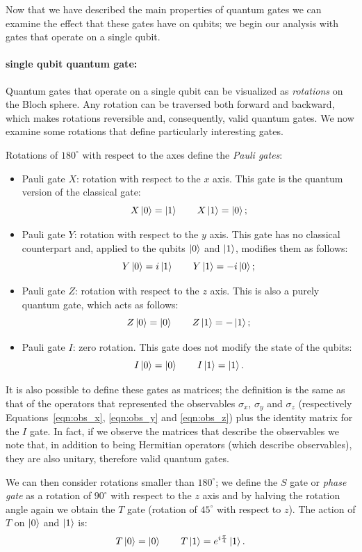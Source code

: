 Now that we have described the main properties of quantum gates we can examine the effect that these gates have on qubits; we begin our analysis with gates that operate on a single qubit.
\paragraph{single qubit quantum gate:}\label{par:single_gate} Quantum gates that operate on a single qubit can be visualized as \emph{rotations} on the Bloch sphere. Any rotation can be traversed both forward and backward, which makes rotations reversible and, consequently, valid quantum gates. We now examine some rotations that define particularly interesting gates.

Rotations of $180^\circ$ with respect to the axes define the \emph{Pauli gates}:
\begin{itemize}
	\item Pauli gate $X$: rotation with respect to the $x$ axis. This gate is the quantum version of the classical  gate:
	\[
	X\Ket{0} = \Ket{1} \qquad  X\Ket{1} = \Ket{0};
	\]
	\item Pauli gate $Y$: rotation with respect to the $y$ axis. This gate has no classical counterpart and, applied to the qubits $\Ket{0}$ and $\Ket{1}$, modifies them as follows:
	\[
	Y\Ket{0} = i\Ket{1} \qquad  Y\Ket{1} = -i\Ket{0};
	\]
	\item Pauli gate $Z$: rotation with respect to the $z$ axis. This is also a purely quantum gate, which acts as follows:
	\[
	Z\Ket{0} = \Ket{0} \qquad  Z\Ket{1} = -\Ket{1};
	\]
	\item Pauli gate $I$: zero rotation. This gate does not modify the state of the qubits:
	\[
	I\Ket{0} = \Ket{0} \qquad  I\Ket{1} = \Ket{1}.
	\]
\end{itemize}
It is also possible to define these gates as matrices; the definition is the same as that of the operators that represented the observables $\sigma_x$, $\sigma_y$ and $\sigma_z$ (respectively Equations~\ref{eqn:obs_x}, \ref{eqn:obs_y} and \ref{eqn:obs_z}) plus the identity matrix for the $I$ gate. In fact, if we observe the matrices that describe the observables we note that, in addition to being Hermitian operators (which describe observables), they are also unitary, therefore valid quantum gates.

We can then consider rotations smaller than $180^\circ$; we define the $S$ gate or \emph{phase gate} as a rotation of $90^\circ$ with respect to the $z$ axis and by halving the rotation angle again we obtain the $T$ gate (rotation of $45^\circ$ with respect to $z$). The action of $T$ on $\Ket{0}$ and $\Ket{1}$ is:
\[
T\Ket{0} = \Ket{0} \qquad  T\Ket{1} = e^{i\frac{\pi}{4}}\Ket{1}.
\]

